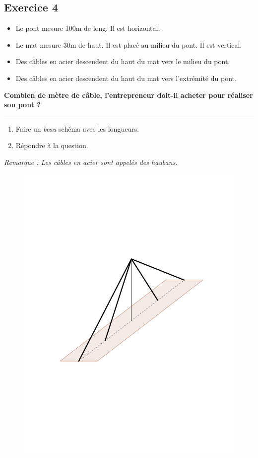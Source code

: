 \documentclass[12pt]{article}
\newcommand{\horrule}[1]{\rule{\linewidth}{#1}} %
\begin{document}
\begin{multicols}{2}

\subsection*{Exercice 4}

\begin{itemize}
\item Le pont mesure 100m de long. Il est horizontal.
\item Le mat mesure 30m de haut. Il est placé au milieu du pont. Il est vertical. 
\item Des câbles en acier descendent du haut du mat vers le milieu du pont.
\item Des câbles en acier descendent du haut du mat vers l'extrémité du pont.
\end{itemize}

\textbf{Combien de mètre de câble, l'entrepreneur doit-il acheter pour réaliser son pont ?}

\horrule{1px}


\begin{enumerate}
\item[1.] Faire un \textit{beau} schéma avec les longueurs.
\item[2.] Répondre à la question. 
\end{enumerate}
\textit{Remarque : Les câbles en acier sont appelés des haubans.}

\begin{figure}[H]
  \centering
  \includegraphics[width=\linewidth, trim={1cm 6cm 1cm 6cm}, clip ]{sources/1/exo-pont-haubans.pdf}
\end{figure}

\end{multicols}
\end{document}
